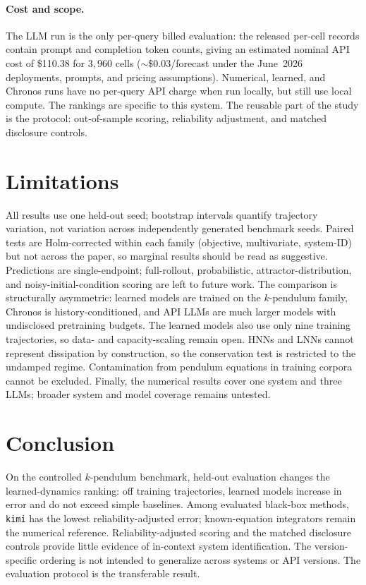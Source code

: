 \documentclass{article}
\begin{document}
\paragraph{Cost and scope.} The LLM run is the only per-query billed evaluation: the
released per-cell records contain prompt and completion token counts, giving an estimated
nominal API cost of \$110.38 for $3{,}960$ cells (${\sim}\$0.03$/forecast under the June~2026
deployments, prompts, and pricing assumptions). Numerical, learned, and Chronos runs have no
per-query API charge when run locally, but still use local compute. The rankings are specific
to this system. The reusable part of the study is the protocol: out-of-sample scoring,
reliability adjustment, and matched disclosure controls.

\section{Limitations}
\label{sec:limitations}
All results use one held-out seed; bootstrap intervals quantify trajectory variation, not
variation across independently generated benchmark seeds. Paired tests are Holm-corrected
within each family (objective, multivariate, system-ID) but not across the paper, so marginal
results should be read as suggestive. Predictions are single-endpoint; full-rollout,
probabilistic, attractor-distribution, and noisy-initial-condition scoring are left to future
work. The comparison is structurally asymmetric: learned models are trained on the
$k$-pendulum family, Chronos is history-conditioned, and API LLMs are much larger models with
undisclosed pretraining budgets. The learned models also use only nine training trajectories,
so data- and capacity-scaling remain open. HNNs and LNNs cannot represent dissipation by
construction, so the conservation test is restricted to the undamped regime. Contamination
from pendulum equations in training corpora cannot be excluded. Finally, the numerical
results cover one system and three LLMs; broader system and model coverage remains untested.

\section{Conclusion}
On the controlled $k$-pendulum benchmark, held-out evaluation changes the
learned-dynamics ranking: off training trajectories, learned models increase in error and do
not exceed simple baselines. Among evaluated black-box methods, \texttt{kimi} has the lowest
reliability-adjusted error; known-equation integrators remain the numerical reference.
Reliability-adjusted scoring and the matched disclosure controls provide little evidence of
in-context system identification. The version-specific ordering is not intended to generalize
across systems or API versions. The evaluation protocol is the transferable result.
\end{document}

